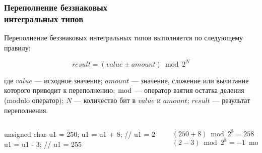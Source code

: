 \documentclass[compress, 8pt]{beamer}
\begin{document}
\begin{frame}[fragile]

    \frametitle{Переполнение беззнаковых \\ интегральных типов}

    Переполнение беззнаковых интегральных типов выполняется по
    следующему правилу:

    \begin{displaymath}
        result = (value \pm amount) \bmod 2^N
    \end{displaymath}

    где
    $value$ --- исходное значение;
    $amount$ --- значение, сложение или вычитание которого приводит
        к переполнению;
    $\bmod$ --- оператор взятия остатка деления (modulo оператор);
    $N$ --- количество бит в $value$ и $amount$;
    $result$ --- результат переполнения.

    \begin{columns}[T]

        \begin{column}{0.5\textwidth}

            \begin{myinplacelisting}[minted language=cpp]
unsigned char u1 = 250;
u1 = u1 + 8; // u1 = 2
u1 = u1 - 3;  // u1 = 255
            \end{myinplacelisting}

        \end{column}

        \begin{column}{0.5\textwidth}

            \begin{displaymath}
                (250 + 8) \bmod 2^8 = 258 \bmod 256 = 2
            \end{displaymath}
            \begin{displaymath}
                (2 - 3) \bmod 2^8 = -1 \bmod 256 = 255
            \end{displaymath}

        \end{column}

    \end{columns}

\end{frame}
\end{document}
